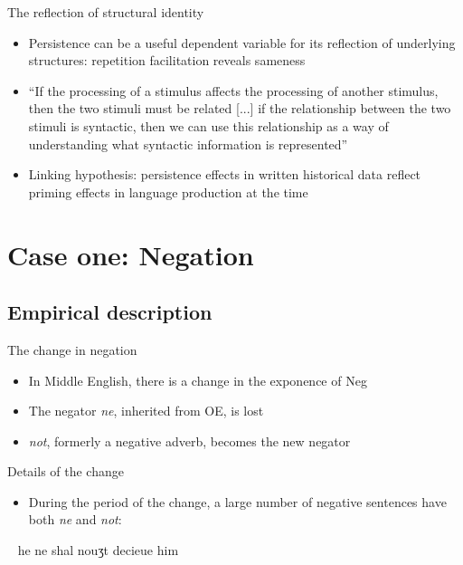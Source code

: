 \documentclass{digs-slides}
\newcommand{\includegraph}[2][]{\mode<beamer>{\texttt{[image: \#2]}}
    \mode<handout>{\texttt{[image: \#2]}}}
\begin{document}
\begin{frame}{The reflection of structural identity}
	\begin{itemize}
		\item Persistence can be a useful dependent variable for its reflection of underlying structures: repetition facilitation reveals sameness
		\item “If the processing of a stimulus affects the processing of another stimulus, then the two stimuli must be related [...] if the relationship between the two stimuli is syntactic, then we can use this relationship as a way of understanding what syntactic information is represented” \parencite[490]{Branigan:1995}
		\item Linking hypothesis: persistence effects in written historical data reflect priming effects in language production at the time
	\end{itemize}
\end{frame}




\section{Case one: Negation}

\subsection{Empirical description}
\label{sec:empirical-aspects}

\begin{frame}{The change in negation}
    \begin{itemize}
      \item In Middle English, there is a change in the exponence of Neg
      \item The negator \emph{ne}, inherited from OE, is lost
      \item \emph{not}, formerly a negative adverb, becomes the new negator
    \end{itemize}
\end{frame}

\begin{frame}{Details of the change}
    \begin{itemize}
      \item During the period of the change, a large number of negative
        sentences have both \emph{ne} and \emph{not}:
    \end{itemize}
    \ex~
    he ne shal nouʒt decieue him 
    \xe
    \begin{center}
        \includegraph{figures/three-lines2}
    \end{center}
\end{frame}
\end{document}
